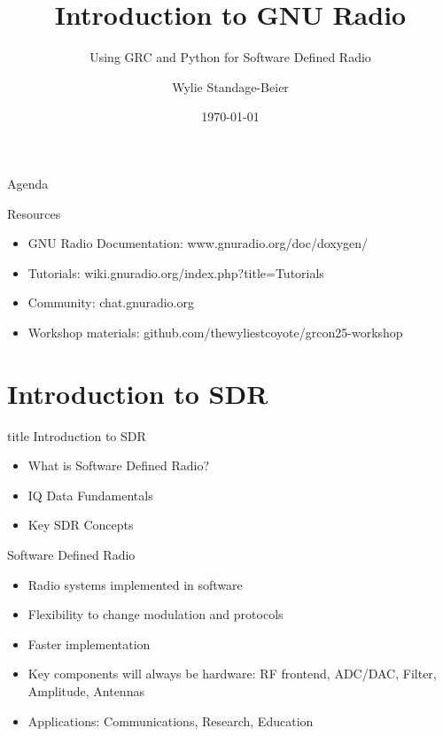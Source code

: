 \documentclass[aspectratio=169,11pt]{beamer}
\title{Introduction to GNU Radio}
\subtitle{Using GRC and Python for Software Defined Radio}
\author{Wylie Standage-Beier}
\institute{GRCon 2025}
\date{\today}
\begin{document}
\begin{frame}
\titlepage
\end{frame}

\begin{frame}{Agenda}
\tableofcontents
\end{frame}

\begin{frame}{Resources}
\begin{itemize}
    \item GNU Radio Documentation: www.gnuradio.org/doc/doxygen/
    \item Tutorials: wiki.gnuradio.org/index.php?title=Tutorials
    \item Community: chat.gnuradio.org
    \item Workshop materials: github.com/thewyliestcoyote/grcon25-workshop
\end{itemize}
\end{frame}

\section{Introduction to SDR}

\begin{frame}[plain]
\vfill
\centering
\begin{beamercolorbox}[sep=8pt,center,shadow=true,rounded=true]{title}
\Large Introduction to SDR\par
\end{beamercolorbox}
\vfill
\begin{itemize}
    \item What is Software Defined Radio?
    \item IQ Data Fundamentals
    \item Key SDR Concepts
\end{itemize}
\vfill
\end{frame}

\begin{frame}{Software Defined Radio}
\begin{itemize}
    \item Radio systems implemented in software
    \item Flexibility to change modulation and protocols
    \item Faster implementation
    \item Key components will always be hardware: RF frontend, ADC/DAC, Filter, Amplitude, Antennas
    \item Applications: Communications, Research, Education
\end{itemize}
\end{frame}
\end{document}
